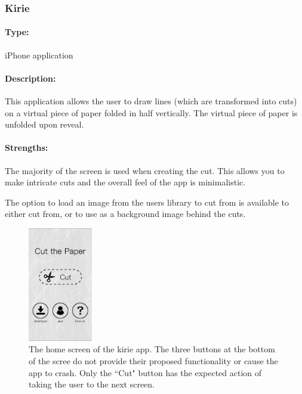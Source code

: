 \documentclass[11pt]{article}
\begin{document}
            
            \subsubsection{Kirie}
            
                \paragraph{Type:} iPhone application %

                \paragraph{Description:}
                This application allows the user to draw lines (which are transformed into cuts) on a virtual piece of paper folded in half vertically. The virtual piece of paper is unfolded upon reveal. 

                \paragraph{Strengths:}
                The majority of the screen is used when creating the cut. This allows you to make intricate cuts and the overall feel of the app is minimalistic. 
                
                The option to load an image from the users library to cut from is available to either cut from, or to use as a background image behind the cuts.
                
                 \begin{figure}
                    \centering
                    \includegraphics[width=0.25\textwidth]{Images/kirieMain.PNG}
                    \caption{The home screen of the kirie app. The three buttons at the bottom of the scree do not provide their proposed functionality or cause the app to crash. Only the ``Cut" button has the expected action of taking the user to the next screen.}
                    \label{fig:kirieMain}
                \end{figure}
                
\end{document}
